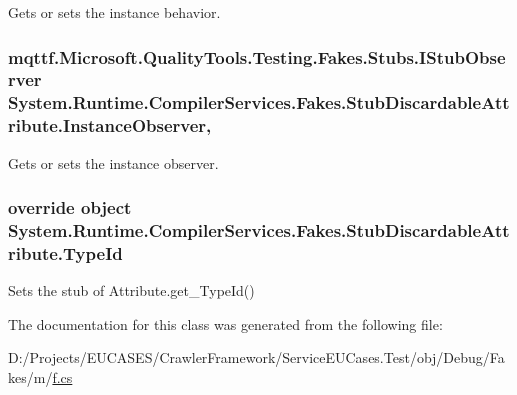 Gets or sets the instance behavior.

\hypertarget{class_system_1_1_runtime_1_1_compiler_services_1_1_fakes_1_1_stub_discardable_attribute_a3202ede3ad3f4a4e0bd2742b53d9a26c}{
\subsubsection[{Instance\-Observer}]{\setlength{\rightskip}{0pt plus 5cm}mqttf.\-Microsoft.\-Quality\-Tools.\-Testing.\-Fakes.\-Stubs.\-I\-Stub\-Observer System.\-Runtime.\-Compiler\-Services.\-Fakes.\-Stub\-Discardable\-Attribute.\-Instance\-Observer\hspace{0.3cm}{\ttfamily [get]}, {\ttfamily [set]}}}\label{class_system_1_1_runtime_1_1_compiler_services_1_1_fakes_1_1_stub_discardable_attribute_a3202ede3ad3f4a4e0bd2742b53d9a26c}


Gets or sets the instance observer.

\hypertarget{class_system_1_1_runtime_1_1_compiler_services_1_1_fakes_1_1_stub_discardable_attribute_a70b66ed36d4f908d0c24f39683c974cb}{
\subsubsection[{Type\-Id}]{\setlength{\rightskip}{0pt plus 5cm}override object System.\-Runtime.\-Compiler\-Services.\-Fakes.\-Stub\-Discardable\-Attribute.\-Type\-Id\hspace{0.3cm}{\ttfamily [get]}}}\label{class_system_1_1_runtime_1_1_compiler_services_1_1_fakes_1_1_stub_discardable_attribute_a70b66ed36d4f908d0c24f39683c974cb}


Sets the stub of Attribute.\-get\-\_\-\-Type\-Id()



The documentation for this class was generated from the following file\-:\begin{DoxyCompactItemize}
\item 
D\-:/\-Projects/\-E\-U\-C\-A\-S\-E\-S/\-Crawler\-Framework/\-Service\-E\-U\-Cases.\-Test/obj/\-Debug/\-Fakes/m/\hyperlink{m_2f_8cs}{f.\-cs}\end{DoxyCompactItemize}

